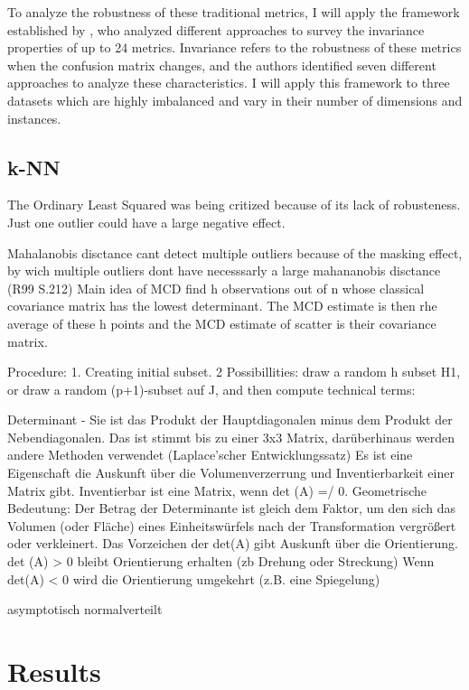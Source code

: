  
To analyze the robustness of these traditional metrics, I will apply the framework established by \citet{sokolova2009systematic}, who analyzed different approaches to survey the invariance properties of up to 24 metrics. 
Invariance refers to the robustness of these metrics when the confusion matrix changes, and the authors identified seven different approaches to analyze these characteristics. 
I will apply this framework to three datasets which are highly imbalanced and vary in their number of dimensions and instances.
\subsection{k-NN}

The Ordinary Least Squared was being critized because of its lack of robusteness. Just one outlier could have a large negative effect.


Mahalanobis disctance cant detect multiple outliers because of the masking effect, by wich multiple outliers dont have necesssarly a large mahananobis disctance (R99 S.212)
Main idea of MCD find h observations out of n whose classical covariance matrix has the lowest determinant. The MCD estimate is then rhe average of these h points 
and the MCD estimate of scatter is their covariance matrix. 


Procedure: 1. Creating initial subset. 
2 Possibillities: draw a random h subset H1, or draw a random (p+1)-subset auf J, and then compute 
technical terms:


Determinant - Sie ist das Produkt der Hauptdiagonalen minus dem Produkt der Nebendiagonalen. Das ist stimmt bis zu einer 3x3 Matrix, darüberhinaus werden andere Methoden verwendet (Laplace'scher Entwicklungssatz)
Es ist eine Eigenschaft die Auskunft über die Volumenverzerrung und Inventierbarkeit einer Matrix gibt. 
Inventierbar ist eine Matrix, wenn det (A) =/ 0. 
Geometrische Bedeutung:  Der Betrag der Determinante ist gleich dem Faktor, um den sich das Volumen (oder Fläche)  eines Einheitswürfels nach der Transformation vergrößert oder verkleinert.
Das Vorzeichen der det(A) gibt Auskunft über die Orientierung. det (A) > 0 bleibt Orientierung erhalten (zb Drehung oder Streckung)
Wenn det(A) < 0 wird die Orientierung umgekehrt (z.B. eine Spiegelung)


asymptotisch normalverteilt 


\section{Results}

